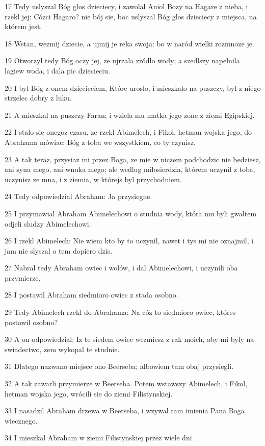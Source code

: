 \par 17 Tedy uslyszal Bóg glos dzieciecy, i zawolal Aniol Bozy na Hagare z nieba, i rzekl jej: Cózci Hagaro? nie bój sie, boc uslyszal Bóg glos dzieciecy z miejsca, na którem jest.
\par 18 Wstan, wezmij dziecie, a ujmij je reka swoja: bo w naród wielki rozmnoze je.
\par 19 Otworzyl tedy Bóg oczy jej, ze ujrzala zródlo wody; a szedlszy napelnila lagiew woda, i dala pic dziecieciu.
\par 20 I byl Bóg z onem dziecieciem, Które uroslo, i mieszkalo na puszczy, byl z niego strzelec dobry z luku.
\par 21 A mieszkal na puszczy Faran; i wziela mu matka jego zone z ziemi Egipskiej.
\par 22 I stalo sie onegoz czasu, ze rzekl Abimelech, i Fikol, hetman wojska jego, do Abrahama mówiac: Bóg z toba we wszystkiem, co ty czynisz.
\par 23 A tak teraz, przysiaz mi przez Boga, ze mie w niczem podchodzic nie bedziesz, ani syna mego, ani wnuka mego; ale wedlug milosierdzia, którem uczynil z toba, uczynisz ze mna, i z ziemia, w którejs byl przychodniem.
\par 24 Tedy odpowiedzial Abraham: Ja przysiegne.
\par 25 I przymawial Abraham Abimelechowi o studnia wody, która mu byli gwaltem odjeli sludzy Abimelechowi.
\par 26 I rzekl Abimelech: Nie wiem kto by to uczynil, nawet i tys mi nie oznajmil, i jam nie slyszal o tem dopiero dzis.
\par 27 Nabral tedy Abraham owiec i wolów, i dal Abimelechowi, i uczynili oba przymierze.
\par 28 I postawil Abraham siedmioro owiec z stada osobno.
\par 29 Tedy Abimelech rzekl do Abrahama: Na cóz to siedmioro owiec, któres postawil osobno?
\par 30 A on odpowiedzial: Iz te siedem owiec wezmiesz z rak moich, aby mi byly na swiadectwo, zem wykopal te studnie.
\par 31 Dlatego nazwano miejsce ono Beerseba; albowiem tam obaj przysiegli.
\par 32 A tak zawarli przymierze w Beerseba. Potem wstawszy Abimelech, i Fikol, hetman wojska jego, wrócili sie do ziemi Filistynskiej.
\par 33 I nasadzil Abraham drzewa w Beerseba, i wzywal tam imienia Pana Boga wiecznego.
\par 34 I mieszkal Abraham w ziemi Filistynskiej przez wiele dni.

